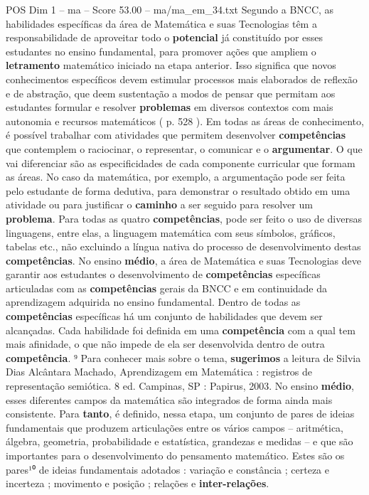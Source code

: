 \begin{textsample}{POS Dim 1 – ma – Score 53.00 – ma/ma\_em\_34.txt}
Segundo a BNCC, as habilidades específicas da área de Matemática e suas Tecnologias têm a responsabilidade de aproveitar todo o \textbf{potencial} já constituído por esses estudantes no ensino fundamental, para promover ações que ampliem o \textbf{letramento} matemático iniciado na etapa anterior.
Isso significa que novos conhecimentos específicos devem estimular processos mais elaborados de reflexão e de abstração, que deem sustentação a modos de pensar que permitam aos estudantes formular e resolver \textbf{problemas} em diversos contextos com mais autonomia e recursos matemáticos ( p. 528 ).
Em todas as áreas de conhecimento, é possível trabalhar com atividades que permitem desenvolver \textbf{competências} que contemplem o raciocinar, o representar, o comunicar e o \textbf{argumentar}.
O que vai diferenciar são as especificidades de cada componente curricular que formam as áreas.
No caso da matemática, por exemplo, a argumentação pode ser feita pelo estudante de forma dedutiva, para demonstrar o resultado obtido em uma atividade ou para justificar o \textbf{caminho} a ser seguido para resolver um \textbf{problema}.
Para todas as quatro \textbf{competências}, pode ser feito o uso de diversas linguagens, entre elas, a linguagem matemática com seus símbolos, gráficos, tabelas etc., não excluindo a língua nativa do processo de desenvolvimento destas \textbf{competências}.
No ensino \textbf{médio}, a área de Matemática e suas Tecnologias deve garantir aos estudantes o desenvolvimento de \textbf{competências} específicas articuladas com as \textbf{competências} gerais da BNCC e em continuidade da aprendizagem adquirida no ensino fundamental.
Dentro de todas as \textbf{competências} específicas há um conjunto de habilidades que devem ser alcançadas.
Cada habilidade foi definida em uma \textbf{competência} com a qual tem mais afinidade, o que não impede de ela ser desenvolvida dentro de outra \textbf{competência}. ⁹ Para conhecer mais sobre o tema, \textbf{sugerimos} a leitura de Silvia Dias Alcântara Machado, Aprendizagem em Matemática : registros de representação semiótica. 8 ed.
Campinas, SP : Papirus, 2003.
No ensino \textbf{médio}, esses diferentes campos da matemática são integrados de forma ainda mais consistente.
Para \textbf{tanto}, é definido, nessa etapa, um conjunto de pares de ideias fundamentais que produzem articulações entre os vários campos – aritmética, álgebra, geometria, probabilidade e estatística, grandezas e medidas – e que são importantes para o desenvolvimento do pensamento matemático.
Estes são os pares¹⁰ de ideias fundamentais adotados : variação e constância ; certeza e incerteza ; movimento e posição ; relações e \textbf{inter-relações}.

\end{textsample}
